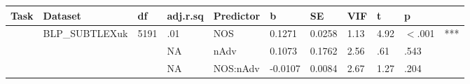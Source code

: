 \begin{table}[ht]
\centering
\begingroup\normalsize
\begin{tabular}{lllllllllll}
  \hline
Task & Dataset & df & adj.r.sq & Predictor & b & SE & VIF & t & p &  \\ 
  \hline
 & BLP\_SUBTLEXuk & 5191 & .01 & NOS & 0.1271 & 0.0258 & 1.13 & 4.92 & $<$.001 & *** \\ 
   &  &  & NA & nAdv & 0.1073 & 0.1762 & 2.56 & .61 & .543 &   \\ 
   &  &  & NA & NOS:nAdv & -0.0107 & 0.0084 & 2.67 & 1.27 & .204 &   \\ 
   \hline
\end{tabular}
\endgroup
\end{table}
